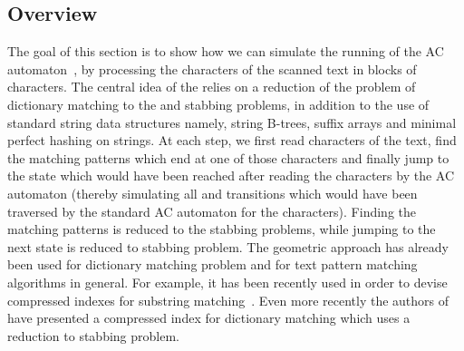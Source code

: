 \documentclass{article}
\newcommand{\?}{\mskip1.5mu}
\begin{document}
\subsection{Overview}
The goal of this section is to show how we can simulate the running of the AC automaton~\cite{AC75}, by processing the characters of the scanned text in blocks of  characters. The central idea of the relies on a reduction of the problem of dictionary matching to the  and  stabbing problems, in addition to the use of standard string data structures namely, string B-trees, suffix arrays and minimal perfect hashing on strings.
At each step, we first read  characters of the text, find the matching patterns which end at one of those characters and finally jump to the state which would have been reached after reading the  characters by the AC automaton (thereby simulating all  and  transitions which would have been traversed by the standard AC automaton for the  characters). Finding the matching patterns is reduced to the  stabbing problems, while jumping to the next state is reduced to  stabbing problem. 
The geometric approach has already been used for dictionary matching problem and for text pattern matching algorithms in general. For example, it has been recently used in order to devise compressed indexes for substring matching~\cite{GV05,N04,CHSV08}. Even more recently the authors of~\cite{TWLY09} have presented a compressed index for dictionary matching which uses a reduction to  stabbing problem. 
\end{document}
